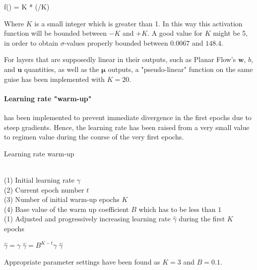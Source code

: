\begin{nalign}
f() = K * \tanh(/K)
\end{nalign}

Where $K$ is a small integer which is greater than 1. In this way this activation function
will be bounded between $-K$ and $+K$. A good value for $K$ might be 5, in order to obtain
$\sigma$-values properly bounded between $0.0067$ and $148.4$.

For layers that are supposedly linear in their outputs, such as Planar Flow's 
$\mathbf{w}$, $b$, and $\mathbf{u}$ quantities, as well as the $\boldsymbol\mu$ outputs,
a "pseudo-linear" function
on the same guise has been implemented with $K=20$. 

\paragraph{Learning rate "warm-up"} has been implemented to prevent immediate divergence
in the first epochs due to steep gradients. 
Hence, the learning rate has been raised from a very small value
to regimen value during the course of the very first epochs.

\begin{algorithm}
\caption{Learning rate warm-up}
\begin{algorithmic}[1]

\REQUIRE ~~\\
(1) Initial learning rate $\gamma$   \\
(2) Current epoch number $t$ \\
(3) Number of initial warm-up epochs $K$ \\
(4) Base value of the warm up coefficient $B$  which has to be less than $1$
\ENSURE~~\\
(1) Adjusted and progressively increasing learning rate $\hat{\gamma}$ during the first $K$ epochs
\item[]
    \STATE $\hat{\gamma} = \gamma$
\ELSE
    \STATE $\hat{\gamma} = B^{K-t} \gamma$
\ENDIF
\RETURN $\hat{\gamma}$
\end{algorithmic}
\end{algorithm}

Appropriate parameter settings have been found as $K=3$ and $B=0.1$.

